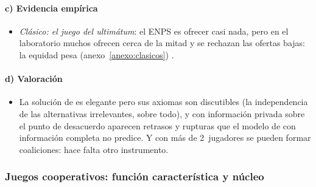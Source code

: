 \documentclass[11pt]{article}
\begin{document}
\paragraph{c) Evidencia empírica}

\begin{itemize}
\item \emph{Clásico: el juego del ultimátum}\nocite{GuthSchmittbergerSchwarze1982Ultimatum}: el ENPS es ofrecer casi nada, pero en el laboratorio muchos ofrecen cerca de la mitad y se rechazan las ofertas bajas: la equidad pesa (anexo~\ref{anexo:clasicos}) .
\end{itemize}

\paragraph{d) Valoración}

\begin{itemize}
\item La solución de  es elegante pero sus axiomas son discutibles (la independencia de las alternativas irrelevantes, sobre todo), y con información privada sobre el punto de desacuerdo aparecen retrasos y rupturas que el modelo de  con información completa no predice. Y con más de 2~jugadores se pueden formar coaliciones: hace falta otro instrumento.
\end{itemize}

\subsubsection{Juegos cooperativos: función característica y núcleo}\label{sec:nucleo}
\end{document}
